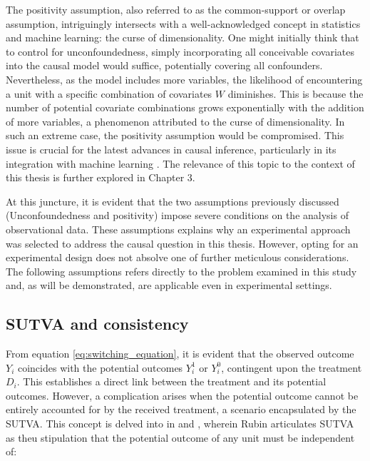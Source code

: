 The positivity assumption, also referred to as the common-support or overlap assumption, intriguingly intersects with a well-acknowledged concept in statistics and machine learning: the curse of dimensionality. One might initially think that to control for unconfoundedness, simply
incorporating all conceivable covariates into the causal model would suffice, potentially covering all confounders. Nevertheless, as the model includes more variables, the likelihood of encountering a unit with a specific combination of covariates $W$ diminishes. This is because 
the number of potential covariate combinations grows exponentially with the addition of more variables, a phenomenon attributed to the curse of dimensionality. In such an extreme case, the positivity assumption would be compromised. This issue is crucial for the latest advances 
in causal inference, particularly in its integration with machine learning \parencite{damour_overlap_2021}. The relevance of this topic to the context of this thesis is further explored in Chapter 3.

At this juncture, it is evident that the two assumptions previously discussed (Unconfoundedness and positivity) impose severe conditions on the analysis of observational data. These assumptions explains why an experimental approach was selected to address the causal question in this thesis.
However, opting for an experimental design does not absolve one of further meticulous considerations. The following assumptions refers directly to the problem examined in this study and, as will be demonstrated, are applicable even in experimental settings.

\subsection{SUTVA and consistency}
\label{sub:sutva_and_consistency}

From equation \ref{eq:switching_equation}, it is evident that the observed outcome $Y_i$ coincides with the potential outcomes $Y_i^1$ or $Y_i^0$, contingent upon the treatment $D_i$. This establishes a direct link between the treatment and its potential outcomes. However, a complication 
arises when the potential outcome cannot be entirely accounted for by the received treatment, a scenario encapsulated by the \gls{SUTVA}. This concept is delved into in \textcite{rubin_randomization_1980} and \textcite{rubin_comment_1986}, wherein Rubin articulates \gls{SUTVA} as
theu stipulation that the potential outcome of any unit must be independent of:

